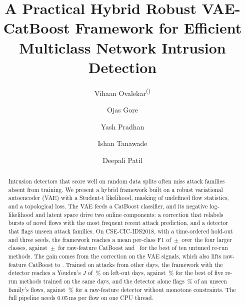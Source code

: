 \documentclass[runningheads,a4paper]{llncs}
\newcommand{\pmsd}[2]{#1\,$\pm$\,#2}
\begin{document}
\title{A Practical Hybrid Robust VAE-CatBoost Framework for Efficient Multiclass Network Intrusion Detection}

\author{Vihaan Ovalekar\textsuperscript{(\Letter)} \and Ojas Gore \and Yash Pradhan \and Ishan Tanawade \and Deepali Patil}

\maketitle

\begin{abstract}
Intrusion detectors that score well on random data splits often miss attack families absent from training. We present a hybrid framework built on a robust variational autoencoder (VAE) with a Student-t likelihood, masking of undefined flow statistics, and a topological loss. The VAE feeds a CatBoost classifier, and its negative log-likelihood and latent space drive two online components: a correction that relabels bursts of novel flows with the most frequent recent attack prediction, and a detector that flags unseen attack families. On CSE-CIC-IDS2018, with a time-ordered hold-out and three seeds, the framework reaches a mean per-class F1 of \pmsd{\OursMean}{\OursSd} over the four larger classes, against \pmsd{\RawMean}{\RawSd} for raw-feature CatBoost and \BestBaselineMean\ for the best of ten untuned re-run methods. The gain comes from the correction on the VAE signals, which also lifts raw-feature CatBoost to \RawCorrMean. Trained on attacks from other days, the framework with the detector reaches a Youden's $J$ of \JOursDaysEqual\,\% on left-out days, against \JEqualBestDays\,\% for the best of five re-run methods trained on the same days, and the detector alone flags \DetectorAloneDetection\,\% of an unseen family's flows, against \RawDetectorTwoDetection\,\% for a raw-feature detector without monotone constraints. The full pipeline needs 0.05\,ms per flow on one CPU thread.

\end{abstract}
\end{document}
